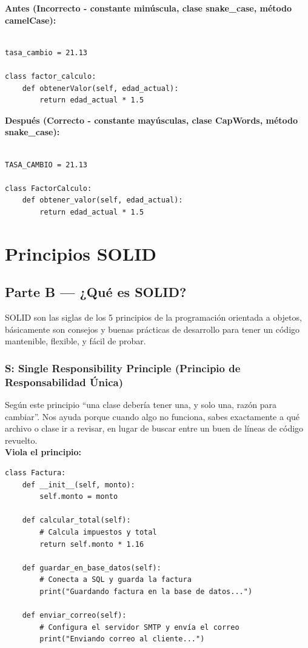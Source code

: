 \documentclass{article}
\begin{document}
        	\textbf{Antes (Incorrecto - constante minúscula, clase snake\_case, método camelCase):}

        	\begin{verbatim}

tasa_cambio = 21.13

class factor_calculo:
    def obtenerValor(self, edad_actual):
        return edad_actual * 1.5

        	\end{verbatim}
    
        	\textbf{Después (Correcto - constante mayúsculas, clase CapWords, método snake\_case):}
        	\begin{verbatim}

TASA_CAMBIO = 21.13

class FactorCalculo:
    def obtener_valor(self, edad_actual):
        return edad_actual * 1.5

        	\end{verbatim}
    \newpage
	\section{Principios SOLID}
			\subsection{Parte B --- ¿Qué es SOLID?}
    			SOLID son las siglas de los 5 principios de la programación orientada a objetos, básicamente son consejos
				y buenas prácticas de desarrollo para tener un código mantenible, flexible, y fácil de probar. 


    		\subsubsection*{S: Single Responsibility Principle (Principio de Responsabilidad Única)}
    			Según este principio ``una clase debería tener una, y solo una, razón para cambiar''. Nos ayuda porque cuando
				algo no funciona, sabes exactamente a qué archivo o clase ir a revisar, en lugar de buscar entre un buen de 
				líneas de código revuelto.\\ 
    
   		 		\textbf{Viola el principio:}
	    		\begin{verbatim}
class Factura:
    def __init__(self, monto):
        self.monto = monto

    def calcular_total(self):
        # Calcula impuestos y total
        return self.monto * 1.16

    def guardar_en_base_datos(self):
        # Conecta a SQL y guarda la factura
        print("Guardando factura en la base de datos...")

    def enviar_correo(self):
        # Configura el servidor SMTP y envía el correo
        print("Enviando correo al cliente...")
    			\end{verbatim}
    
\end{document}
